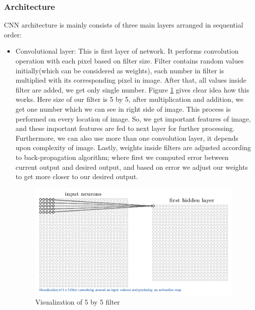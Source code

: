 \documentclass[12pt, letterpaper]{article}
\begin{document}
\subsubsection{Architecture}

CNN architecture is mainly consists of three main layers arranged in sequential order:

\begin{itemize}
	\item Convolutional layer: This is first layer of network. It performs convolution operation with each pixel based on filter size. Filter contains random values initially(which can be considered as weights), each number in filter is multiplied with its corresponding pixel in image. After that, all values inside filter are added, we get only single number. Figure \ref{features} gives clear idea how this works. Here size of our filter is 5 by 5, after multiplication and addition, we get one number which we can see in right side of image. This process is performed on every location of image. So, we get important features of image, and these important features are fed to next layer for further processing. Furthermore, we can also use more than one convolution layer, it depends upon complexity of image. Lastly, weights inside filters are adjusted according to back-propagation algorithm; where first we computed error between current output and desired output, and based on error we adjust our weights to get more closer to our desired output.
	
	\begin{figure}[!h]
		\begin{center}	
			\includegraphics[scale = 0.8]{ActivationMap.png}
			\caption{ \cite{features_map} Visualization of 5 by 5 filter } \label{features}
		\end{center}
	\end{figure}  
		

\end{itemize}
\end{document}

